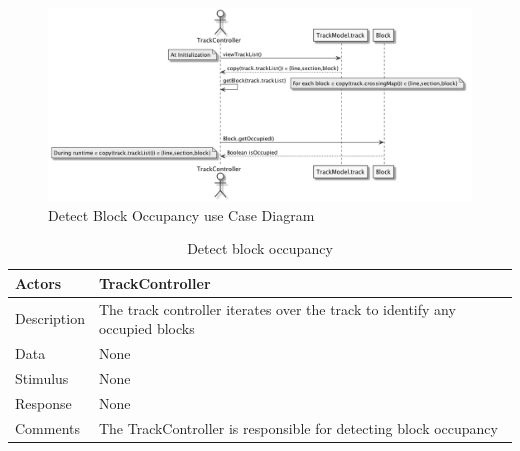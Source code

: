 \documentclass[]{article}
\begin{document}
\begin{figure}[H]
	\centering
	\includegraphics[scale=.5]{detectOccupied.png}
	\caption{Detect Block Occupancy use Case Diagram}
\end{figure}
\begin{table}[H]
	\centering
	\caption{Detect block occupancy}
	\begin{tabular}{|l|l|}
		\hline
		Actors & \parbox[t]{10cm}{TrackController} \\ \hline
		Description & \parbox[t]{10cm}{The track controller iterates over the track to identify any occupied blocks} \\ \hline
		Data &  \parbox[t]{10cm}{None} \\ \hline
		Stimulus &  \parbox[t]{10cm}{None} \\ \hline
		Response & \parbox[t]{10cm}{None}\\ \hline
		Comments & \parbox[t]{10cm}{The TrackController is responsible for detecting block occupancy}  \\ \hline
	\end{tabular}
\end{table}
\end{document}
